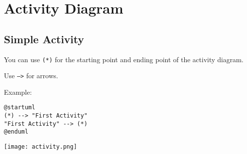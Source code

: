 %
%
% 
%
%
%
%
%
% 

\section{Activity Diagram}

\subsection{Simple Activity}

\begin{description}
\item
You can use \texttt{(*)} for the starting point and ending point of the activity
diagram.

\item
Use \texttt{-->} for arrows.

\end{description}

Example:

\begin{lstlisting}
@startuml
(*) --> "First Activity"
"First Activity" --> (*)
@enduml
\end{lstlisting}

\begin{center}
\texttt{[image: activity.png]}
\end{center}


